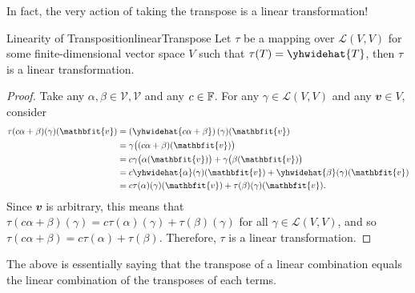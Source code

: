 \documentclass[math, code]{amznotes}
\theoremstyle{remark}
\begin{document}
In fact, the very action of taking the transpose is a linear transformation!
\begin{probox}{Linearity of Transposition}{linearTranspose}
    Let $\tau$ be a mapping over $\mathcal{L}(V, V)$ for some finite-dimensional vector space $V$ such that $\tau(T) = \yhwidehat{T}$, then $\tau$ is a linear transformation.
    \tcblower
    \begin{proof}
        Take any $\alpha, \beta \in \mathcal{V, V}$ and any $c \in \mathbb{F}$. For any $\gamma \in \mathcal{L}(V, V)$ and any $\mathbfit{v} \in V$, consider 
        \begin{align*}
            \tau(c\alpha + \beta)(\gamma)(\mathbfit{v}) & = \left(\yhwidehat{c\alpha + \beta}\right)(\gamma)(\mathbfit{v}) \\
            & = \gamma\bigl((c\alpha + \beta)(\mathbfit{v})\bigr) \\
            & = c\gamma\bigl(\alpha(\mathbfit{v})\bigr) + \gamma\bigl(\beta(\mathbfit{v})\bigr) \\
            & = c\yhwidehat{\alpha}(\gamma)(\mathbfit{v}) + \yhwidehat{\beta}(\gamma)(\mathbfit{v}) \\
            & = c\tau(\alpha)(\gamma)(\mathbfit{v}) + \tau(\beta)(\gamma)(\mathbfit{v}).
        \end{align*}
        Since $\mathbfit{v}$ is arbitrary, this means that $\tau(c\alpha + \beta)(\gamma) = c\tau(\alpha)(\gamma) + \tau(\beta)(\gamma)$ for all $\gamma \in \mathcal{L}(V, V)$, and so $\tau(c\alpha + \beta) = c\tau(\alpha) + \tau(\beta)$. Therefore, $\tau$ is a linear transformation.
    \end{proof}
\end{probox}
The above is essentially saying that the transpose of a linear combination equals the linear combination of the transposes of each terms.
\end{document}
